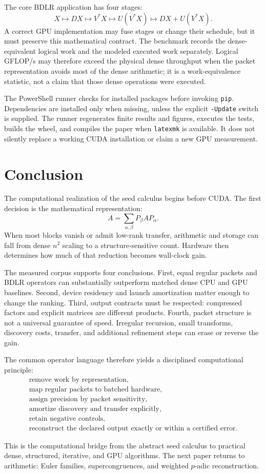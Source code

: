 \documentclass[11pt]{article}
\theoremstyle{definition}
\theoremstyle{remark}
\begin{document}
The core BDLR application has four stages:
\[
\boxed{
X
\longmapsto
DX
\longmapsto
V^*X
\longmapsto
U(V^*X)
\longmapsto
DX+U(V^*X).
}
\]
A correct GPU implementation may fuse stages or change their schedule, but it must preserve this mathematical contract. The benchmark records the dense-equivalent logical work and the modeled executed work separately. Logical GFLOP/s may therefore exceed the physical dense throughput when the packet representation avoids most of the dense arithmetic; it is a work-equivalence statistic, not a claim that those dense operations were executed.

The PowerShell runner checks for installed packages before invoking \texttt{pip}. Dependencies are installed only when missing, unless the explicit \texttt{-Update} switch is supplied. The runner regenerates finite results and figures, executes the tests, builds the wheel, and compiles the paper when \texttt{latexmk} is available. It does not silently replace a working CUDA installation or claim a new GPU measurement.

\section{Conclusion}\label{sec:conclusion}

The computational realization of the seed calculus begins before CUDA. The first decision is the mathematical representation:
\[
A=\sum_{\alpha,\beta}P_\beta AP_\alpha.
\]
When most blocks vanish or admit low-rank transfer, arithmetic and storage can fall from dense $n^2$ scaling to a structure-sensitive count. Hardware then determines how much of that reduction becomes wall-clock gain.

The measured corpus supports four conclusions. First, equal regular packets and BDLR operators can substantially outperform matched dense CPU and GPU baselines. Second, device residency and launch amortization matter enough to change the ranking. Third, output contracts must be respected: compressed factors and explicit matrices are different products. Fourth, packet structure is not a universal guarantee of speed. Irregular recursion, small transforms, discovery costs, transfer, and additional refinement steps can erase or reverse the gain.

The common operator language therefore yields a disciplined computational principle:
\[
\boxed{
\begin{gathered}
\text{remove work by representation},\\
\text{map regular packets to batched hardware},\\
\text{assign precision by packet sensitivity},\\
\text{amortize discovery and transfer explicitly},\\
\text{retain negative controls},\\
\text{reconstruct the declared output exactly or within a certified error}.
\end{gathered}
}
\]

This is the computational bridge from the abstract seed calculus to practical dense, structured, iterative, and GPU algorithms. The next paper returns to arithmetic: Euler families, supercongruences, and weighted $p$-adic reconstruction.
\end{document}
